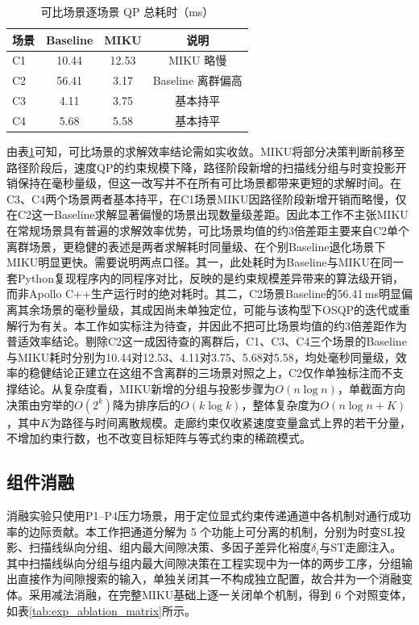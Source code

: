 \documentclass[a4paper,11pt]{ctexart}
\theoremstyle{definition}
\begin{document}
\begin{table}[htbp]
\centering
\caption{可比场景逐场景 QP 总耗时（ms）}
\label{tab:exp_qp_percomp}
\small
\begin{tabular}{lccc}
\toprule
\textbf{场景} & \textbf{Baseline} & \textbf{MIKU} & \textbf{说明} \\
\midrule
C1 & 10.44 & 12.53 & MIKU 略慢 \\
C2 & 56.41 & 3.17 & Baseline 离群偏高 \\
C3 & 4.11 & 3.75 & 基本持平 \\
C4 & 5.68 & 5.58 & 基本持平 \\
\bottomrule
\end{tabular}
\end{table}

由表\ref{tab:exp_qp_percomp}可知，可比场景的求解效率结论需如实收敛。MIKU将部分决策判断前移至路径阶段后，速度QP的约束规模下降，路径阶段新增的扫描线分组与时变投影开销保持在毫秒量级，但这一改写并不在所有可比场景都带来更短的求解时间。在C3、C4两个场景两者基本持平，在C1场景MIKU因路径阶段新增开销而略慢，仅在C2这一Baseline求解显著偏慢的场景出现数量级差距。因此本工作不主张MIKU在常规场景具有普遍的求解效率优势，可比场景均值的约3倍差距主要来自C2单个离群场景，更稳健的表述是两者求解耗时同量级、在个别Baseline退化场景下MIKU明显更快。需要说明两点口径。其一，此处耗时为Baseline与MIKU在同一套Python复现程序内的同程序对比，反映的是约束规模差异带来的算法级开销，而非Apollo C++生产运行时的绝对耗时。其二，C2场景Baseline的56.41\,ms明显偏离其余场景的毫秒量级，其成因尚未单独定位，可能与该构型下OSQP的迭代或重解行为有关。本工作如实标注为待查，并因此不把可比场景均值的约3倍差距作为普适效率结论。剔除C2这一成因待查的离群后，C1、C3、C4三个场景的Baseline与MIKU耗时分别为10.44对12.53、4.11对3.75、5.68对5.58，均处毫秒同量级，效率的稳健结论正建立在这组不含离群的三场景对照之上，C2仅作单独标注而不支撑结论。从复杂度看，MIKU新增的分组与投影步骤为$O(n \log n)$，单截面方向决策由穷举的$O(2^k)$降为排序后的$O(k \log k)$，整体复杂度为$O(n \log n + K)$，其中$K$为路径与时间离散规模。走廊约束仅收紧速度变量盒式上界的若干分量，不增加约束行数，也不改变目标矩阵与等式约束的稀疏模式。

\subsection{组件消融}
\label{subsec:exp_ablation}

消融实验只使用P1--P4压力场景，用于定位显式约束传递通道中各机制对通行成功率的边际贡献。本工作把通道分解为 5 个功能上可分离的机制，分别为时变SL投影、扫描线纵向分组、组内最大间隙决策、多因子差异化裕度$\delta_i$与ST走廊注入。其中扫描线纵向分组与组内最大间隙决策在工程实现中为一体的两步工序，分组输出直接作为间隙搜索的输入，单独关闭其一不构成独立配置，故合并为一个消融变体。采用减法消融，在完整MIKU基础上逐一关闭单个机制，得到 6 个对照变体，如表\ref{tab:exp_ablation_matrix}所示。
\end{document}
